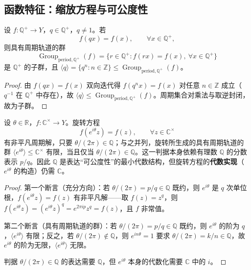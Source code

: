 \subsection{\texorpdfstring{函数特征：缩放方程与可公度性}{函数特征：缩放方程与可公度性}}

\begin{theorem}[有理数缩放方程的具有周期轨道的群]\label{thm:scaling_equation_Q}
设 $f:\mathbb{Q}^+\to Y$，$q\in\mathbb{Q}^+$，$q\ne1$。若
\[
f(qx)=f(x),\qquad \forall x\in\mathbb{Q}^+,
\]
则具有周期轨道的群
\[
\operatorname{Group}_{\mathrm{period},\mathbb{Q}^+}(f)=\{r\in\mathbb{Q}^+: f(rx)=f(x),\ \forall x\in\mathbb{Q}^+\}
\]
是 $\mathbb{Q}^+$ 的子群，且 $\langle q\rangle=\{q^n:n\in\mathbb{Z}\}\le\operatorname{Group}_{\mathrm{period},\mathbb{Q}^+}(f)$。
\end{theorem}

\begin{proof}
由 $f(qx)=f(x)$ 双向迭代得 $f(q^n x)=f(x)$ 对任意 $n\in\mathbb{Z}$ 成立（$q^{-1}$ 在 $\mathbb{Q}^+$ 中存在），故 $\langle q\rangle\le\operatorname{Group}_{\mathrm{period},\mathbb{Q}^+}(f)$。周期集合对乘法与取逆封闭，故为子群。
\end{proof}

\begin{theorem}[有理数与旋转方程的可公度判据]\label{thm:rotation_equation_Q}
设 $\theta\in\mathbb{R}$，$f:\mathbb{C}^\times\to Y$。旋转方程
\[
f(e^{i\theta}z)=f(z),\qquad \forall z\in\mathbb{C}^\times
\]
有非平凡周期解，只要 $\theta/(2\pi)\in\mathbb{Q}$；与之并列，旋转所生成的具有周期轨道的群 $\langle e^{i\theta}\rangle\le\mathbb{C}^\times$ 有限，当且仅当 $\theta/(2\pi)\in\mathbb{Q}$。这一判据本身依赖有理数 $\mathbb{Q}$ 的分数表示 $p/q$。因此 $\mathbb{Q}$ 是表达“可公度性”的最小代数结构，但旋转方程的\textbf{代数实现}（$e^{i\theta}$ 的构造）仍需 $\mathbb{C}$。
\end{theorem}

\begin{proof}
第一个断言（充分方向）：若 $\theta/(2\pi)=p/q\in\mathbb{Q}$ 既约，则 $e^{i\theta}$ 是 $q$ 次单位根，$f(e^{i\theta}z)=f(z)$ 有非平凡解——取 $f(z)=z^{q}$，则 $f(e^{i\theta}z)=(e^{i\theta}z)^{q}=e^{2\pi ip}z^{q}=f(z)$，且 $f$ 非常值。

第二个断言（具有周期轨道的群）：若 $\theta/(2\pi)=p/q\in\mathbb{Q}$ 既约，则 $e^{i\theta}$ 的阶为 $q$，$\langle e^{i\theta}\rangle$ 有限；反之，若 $\theta/(2\pi)\notin\mathbb{Q}$，则 $e^{in\theta}=1$ 要求 $\theta/(2\pi)=k/n\in\mathbb{Q}$，故 $e^{i\theta}$ 的阶为无限，$\langle e^{i\theta}\rangle$ 无限。

判据 $\theta/(2\pi)\in\mathbb{Q}$ 的表达需要 $\mathbb{Q}$，但 $e^{i\theta}$ 本身的代数化需要 $\mathbb{C}$ 中的 $i$。
\end{proof}

